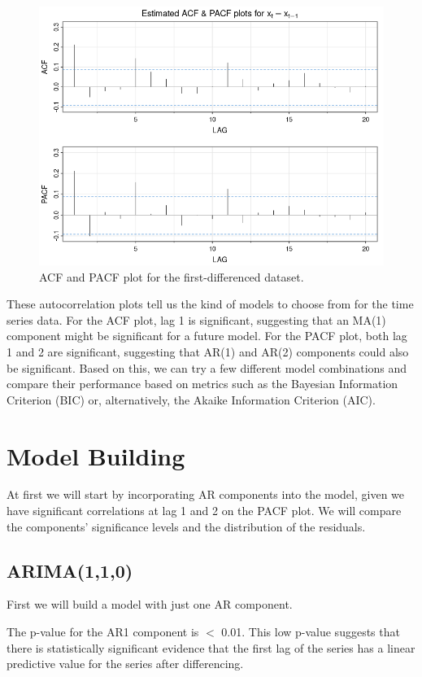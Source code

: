 \documentclass[12pt]{article}
\begin{document}
\begin{figure}[h]
    \centering
    \includegraphics[width=1\textwidth]{images/acf_pacf_plot.png}
    \caption{ACF and PACF plot for the first-differenced dataset.}
    \label{fig:figure_3}
\end{figure}

These autocorrelation plots tell us the kind of models to choose from for the time series data. For the ACF plot, lag 1 is significant, suggesting that an MA(1) component might be significant for a future model. For the PACF plot, both lag 1 and 2 are significant, suggesting that AR(1) and AR(2) components could also be significant. Based on this, we can try a few different model combinations and compare their performance based on metrics such as the Bayesian Information Criterion (BIC) or, alternatively, the Akaike Information Criterion (AIC).

\section{Model Building}
At first we will start by incorporating AR components into the model, given we have significant correlations at lag 1 and 2 on the PACF plot. We will compare the components' significance levels and the distribution of the residuals.

\subsection{ARIMA(1,1,0)}
First we will build a model with just one AR component.



The p-value for the AR1 component is  $<$ 0.01. This low p-value suggests that there is statistically significant evidence that the first lag of the series has a linear predictive value for the series after differencing.
\end{document}
